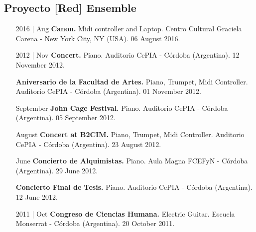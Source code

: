 \documentclass[12pt]{article}%
\begin{document}
\subsection{Proyecto {[}Red{]} Ensemble}%
\begin{itemize}[align=parleft,leftmargin=2.25cm,labelwidth=2cm]
\item[2016 | Aug]
\textbf{Canon.}
Midi controller and Laptop. 
Centro Cultural Graciela Carena {-} New York City, NY (USA). 
06 August 2016.
\end{itemize}%
\begin{itemize}[align=parleft,leftmargin=2.25cm,labelwidth=2cm]
\item[2012 | Nov]
\textbf{Concert.}
Piano. 
Auditorio CePIA {-} Córdoba (Argentina). 
12 November 2012.
\end{itemize}%
\begin{itemize}[align=parleft,leftmargin=2.25cm,labelwidth=2cm]
\item[]
\textbf{Aniversario de la Facultad de Artes.}
Piano, Trumpet, Midi Controller. 
Auditorio CePIA {-} Córdoba (Argentina). 
01 November 2012.
\end{itemize}%
\begin{itemize}[align=parleft,leftmargin=2.25cm,labelwidth=2cm]
\item[September]
\textbf{John Cage Festival.}
Piano. 
Auditorio CePIA {-} Córdoba (Argentina). 
05 September 2012.
\end{itemize}%
\begin{itemize}[align=parleft,leftmargin=2.25cm,labelwidth=2cm]
\item[August]
\textbf{Concert at B2CIM.}
Piano, Trumpet, Midi Controller. 
Auditorio CePIA {-} Córdoba (Argentina). 
23 August 2012.
\end{itemize}%
\begin{itemize}[align=parleft,leftmargin=2.25cm,labelwidth=2cm]
\item[June]
\textbf{Concierto de Alquimistas.}
Piano. 
Aula Magna FCEFyN {-} Córdoba (Argentina). 
29 June 2012.
\end{itemize}%
\begin{itemize}[align=parleft,leftmargin=2.25cm,labelwidth=2cm]
\item[]
\textbf{Concierto Final de Tesis.}
Piano. 
Auditorio CePIA {-} Córdoba (Argentina). 
12 June 2012.
\end{itemize}%
\begin{itemize}[align=parleft,leftmargin=2.25cm,labelwidth=2cm]
\item[2011 | Oct]
\textbf{Congreso de Ciencias Humana.}
Electric Guitar. 
Escuela Monserrat {-} Córdoba (Argentina). 
20 October 2011.
\end{itemize}%
\end{document}
